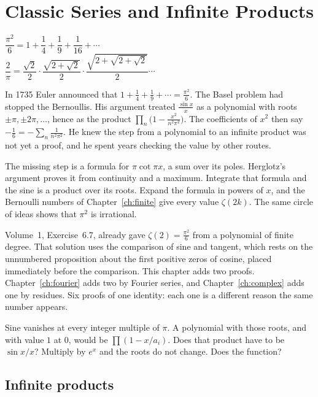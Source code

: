 \chapter{Classic Series and Infinite Products}\label{ch:series}

\begin{center}\itshape
$\dfrac{\pi^2}6=1+\dfrac14+\dfrac19+\dfrac1{16}+\cdots$\\[0.6em]
$\dfrac2\pi=\dfrac{\sqrt2}2\cdot\dfrac{\sqrt{2+\sqrt2}}2\cdot\dfrac{\sqrt{2+\sqrt{2+\sqrt2}}}2\cdots$
\end{center}

In 1735 Euler announced that $1+\frac14+\frac19+\cdots=\frac{\pi^2}6$. The Basel problem had stopped the Bernoullis. His argument treated $\frac{\sin x}x$ as a polynomial with roots $\pm\pi,\pm2\pi,\dots$, hence as the product $\prod_n\bigl(1-\frac{x^2}{n^2\pi^2}\bigr)$. The coefficients of $x^2$ then say $-\frac16=-\sum_n\frac1{n^2\pi^2}$. He knew the step from a polynomial to an infinite product was not yet a proof, and he spent years checking the value by other routes.

The missing step is a formula for $\pi\cot\pi x$, a sum over its poles. Herglotz's argument proves it from continuity and a maximum. Integrate that formula and the sine is a product over its roots. Expand the formula in powers of $x$, and the Bernoulli numbers of Chapter~\ref{ch:finite} give every value $\zeta(2k)$. The same circle of ideas shows that $\pi^2$ is irrational.

Volume~1, Exercise~6.7, already gave $\zeta(2)=\frac{\pi^2}6$ from a polynomial of finite degree. That solution uses the comparison of sine and tangent, which rests on the unnumbered proposition about the first positive zeros of cosine, placed immediately before the comparison. This chapter adds two proofs. Chapter~\ref{ch:fourier} adds two by Fourier series, and Chapter~\ref{ch:complex} adds one by residues. Six proofs of one identity: each one is a different reason the same number appears.

\begin{think}
Sine vanishes at every integer multiple of $\pi$. A polynomial with those roots, and with value $1$ at $0$, would be $\prod(1-x/a_i)$. Does that product have to be $\sin x/x$? Multiply by $e^x$ and the roots do not change. Does the function?
\end{think}

\section{Infinite products}

